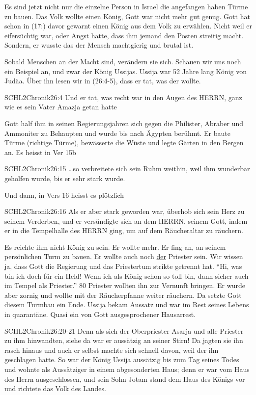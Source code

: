 \documentclass[14pt]{../../inc/mybib}
\newenvironment{block}[1][]{%
  \vspace{1.5em}%
  \noindent\textbf{#1}\par%
  \vspace{0.0em}%
}{%
  \vspace{1em}%
}
\begin{document}
\begin{block}

    Es sind jetzt nicht nur die einzelne Person in Israel die angefangen haben Türme zu bauen. Das Volk wollte einen König, Gott war nicht mehr gut genug. Gott hat schon in (17:) davor gewarnt einen König aus dem Volk zu erwählen. Nicht weil er eifersüchtig war, oder Angst hatte, dass ihm jemand den Posten streitig macht. Sondern, er wusste das der Mensch machtgierig und brutal ist.
    
    Sobald Menschen an der Macht sind, verändern sie sich. Schauen wir uns noch ein Beispiel an, und zwar der König Ussijas. Ussija war 52 Jahre lang König von Judäa. Über ihn lesen wir in (26:4-5), dass er tat, was der \herr{} wollte. 
    \begin{bibelbox}{SCHL}{2Chronik}{26:4}
        Und er tat, was recht war in den Augen des HERRN, ganz wie es sein Vater Amazja getan hatte
    \end{bibelbox} 
    Gott half ihm in seinen Regierungsjahren sich gegen die Philister, Abraber und Ammoniter zu Behaupten und wurde bis nach Ägypten berühmt. Er baute Türme (richtige Türme), bewässerte die Wüste und legte Gärten in den Bergen an. Es heisst in Ver 15b
    \begin{bibelbox}{SCHL}{2Chronik}{26:15}
        \dots so verbreitete sich sein Ruhm weithin, weil ihm wunderbar geholfen wurde, bis er sehr stark wurde.
    \end{bibelbox} 

    Und dann, in Vers 16 heisst es plötzlich
    \begin{bibelbox}{SCHL}{2Chronik}{26:16}
        Als er aber stark geworden war, überhob sich sein Herz zu seinem Verderben, und er versündigte sich an dem HERRN, seinem Gott, indem er in die Tempelhalle des HERRN ging, um auf dem Räucheraltar zu räuchern.
    \end{bibelbox} 
    Es reichte ihm nicht König zu sein. Er wollte mehr. Er fing an, an seinem persönlichen Turm zu bauen. Er wollte auch noch \underline{der} Priester sein. Wir wissen ja, dass Gott die Regierung und das Priestertum strikte getrennt hat. 
    \enquote{Hi, was bin ich doch für ein Held! Wenn ich als König schon so toll bin, dann sicher auch im Tempel als Priester.} 80 Priester wollten ihn zur Vernunft bringen. Er wurde aber zornig und wollte mit der Räucherpfanne weiter räuchern. Da setzte Gott diesem Turmbau ein Ende. Ussija bekam Aussatz und war im Rest seines Lebens in quarantäne. Quasi ein von Gott ausgesprochener Hausarrest.
    \begin{bibelbox}{SCHL}{2Chronik}{26:20-21}
        Denn als sich der Oberpriester Asarja und alle Priester zu ihm hinwandten, siehe da war er aussätzig an seiner Stirn! Da jagten sie ihn rasch hinaus und auch er selbst machte sich schnell davon, weil der \herr{} ihn geschlagen hatte.
        So war der König Ussija aussätzig bis zum Tag seines Todes und wohnte als Aussätziger in einem abgesonderten Haus; denn er war vom Haus des Herrn ausgeschlossen, und sein Sohn Jotam stand dem Haus des Königs vor und richtete das Volk des Landes.
    \end{bibelbox}
\end{block}
\end{document}
